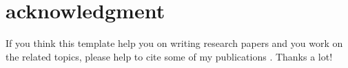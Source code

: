 \section{acknowledgment}
\label{sec:ack}

If you think this template help you on writing research papers and you work on the related topics, please help to cite some of my publications 
\cite{cheng2016task, cheng2017utility, chen2014gmission, cheng2015reliable,  cheng2017prediction, chen2018effective, cheng2018experimental, cheng2018frog, cheng2019cooperation, chen2019minimize}. Thanks a lot!
